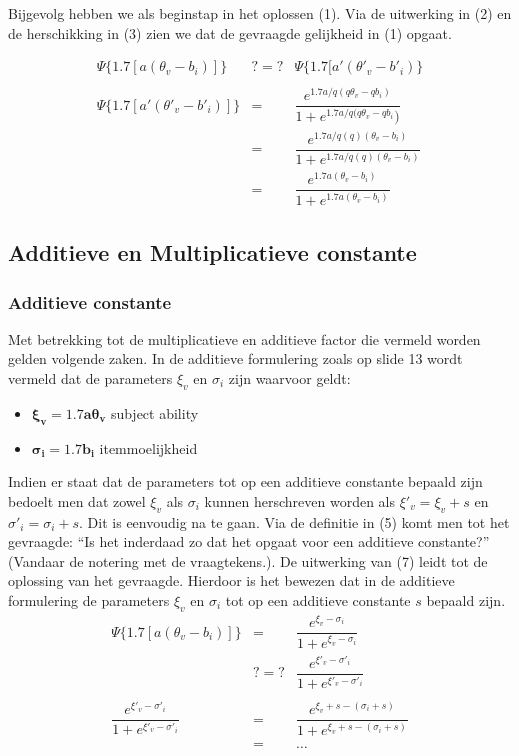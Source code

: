 \documentclass[11pt]{report}
\begin{document}
Bijgevolg hebben we als beginstap in het oplossen (1). Via de uitwerking in (2) en de herschikking in (3) zien we dat de gevraagde gelijkheid in (1) opgaat.

\begin{eqnarray}
\Psi \{1.7[a(\theta_{v}-b_{i})] \} &?=?& \Psi \{1.7[a'(\theta'_{v}-b'_{i}) \}\\
\nonumber \\
\Psi \{1.7[a'(\theta'_{v}-b'_{i})] \} &=& \dfrac{e^{1.7a/q(q\theta_{v}-qb_{i})}}{1+e^{1.7a/q(q\theta_{v}-qb_{i}})}\\
&=& \dfrac{e^{1.7a/q(q)(\theta_{v}-b_{i})}}{1+e^{1.7a/q(q)(\theta_{v}-b_{i})}} \\
&=& \dfrac{e^{1.7a(\theta_{v}-b_{i})}}{1+e^{1.7a(\theta_{v}-b_{i})}}
\end{eqnarray}

\subsection*{Additieve en Multiplicatieve constante}
\subsubsection*{Additieve constante}
Met betrekking tot de multiplicatieve en additieve factor die vermeld worden gelden volgende zaken. In de additieve formulering zoals op slide 13 wordt vermeld dat de parameters $\xi_{v}$ en $\sigma_{i}$ zijn waarvoor geldt:
\begin{itemize}
\item $\mathbf{\bm\xi_{v}=1.7a\bm\theta_{v}}$ subject ability
\item $\mathbf{\bm\sigma_{i}=1.7b_{i}}$ itemmoelijkheid
\end{itemize}

Indien er staat dat de parameters tot op een additieve constante bepaald zijn bedoelt men dat zowel $\xi_{v}$ als $\sigma_{i}$ kunnen herschreven worden als $\xi'_{v} = 
\xi_{v} + s$ en $\sigma'_{i} = \sigma_{i}+s$. Dit is eenvoudig na te gaan. Via de definitie in (5) komt men tot het gevraagde: ``Is het inderdaad zo dat het opgaat voor een additieve constante?'' (Vandaar de notering met de vraagtekens.). De uitwerking van (7) leidt tot de oplossing van het gevraagde. Hierdoor is het bewezen dat in de additieve formulering de parameters $\xi_{v}$ en $\sigma_{i}$ tot op een additieve constante $s$ bepaald zijn.
\begin{eqnarray}
\Psi \{1.7[a(\theta_{v}-b_{i})] \} &=& \dfrac{e^{\xi_{v}-\sigma_{i}}}{1+e^{\xi_{v}-\sigma_{i}}}\\
&?=?& \dfrac{e^{\xi'_{v}-\sigma'_{i}}}{1+e^{\xi'_{v}-\sigma'_{i}}}\\
\nonumber\\
\dfrac{e^{\xi'_{v}-\sigma'_{i}}}{1+e^{\xi'_{v}-\sigma'_{i}}} &=& \dfrac{e^{\xi_{v}+s-(\sigma_{i}+s)}}{1+e^{\xi_{v}+s-(\sigma_{i}+s)}}\\
&=& \dots \nonumber
\end{eqnarray}
\end{document}

